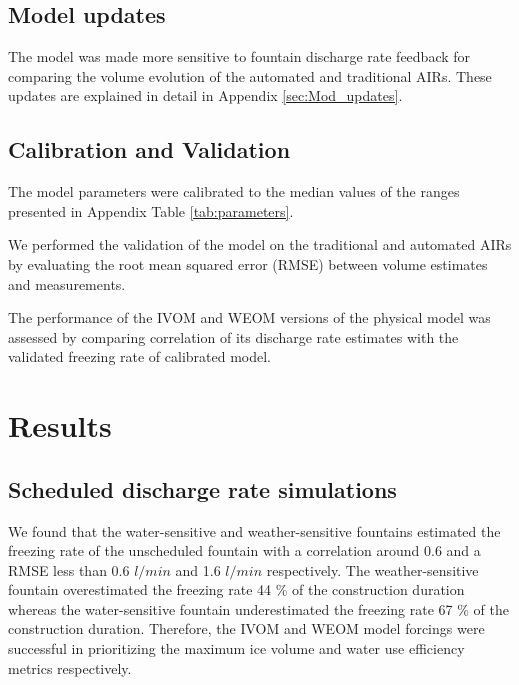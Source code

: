 \documentclass[tc, manuscript]{copernicus}
\begin{document}
\subsection{Model updates}
The model was made more sensitive to fountain discharge rate feedback for comparing the volume evolution of the
automated and traditional AIRs. These updates are explained in detail in Appendix \ref{sec:Mod_updates}.

\subsection{Calibration and Validation}

The model parameters were calibrated to the median values of the ranges presented in Appendix Table
\ref{tab:parameters}.

We performed the validation of the model on the traditional and automated AIRs by evaluating the root mean
squared error (RMSE) between volume estimates and measurements. 

The performance of the IVOM and WEOM versions of the physical model was assessed by comparing correlation of its
discharge rate estimates with the validated freezing rate of calibrated model.

\section{Results}

\subsection{Scheduled discharge rate simulations}

We found that the water-sensitive and weather-sensitive fountains estimated the freezing rate of the unscheduled
fountain with a correlation around 0.6 and a RMSE less than 0.6 $l/min$ and 1.6  $l/min$ respectively. The
weather-sensitive fountain overestimated the freezing rate 44 \% of the construction duration whereas the
water-sensitive fountain underestimated the freezing rate 67 \% of the construction duration. Therefore, the
IVOM and WEOM model forcings were successful in prioritizing the maximum ice volume and water use efficiency
metrics respectively.
\end{document}
